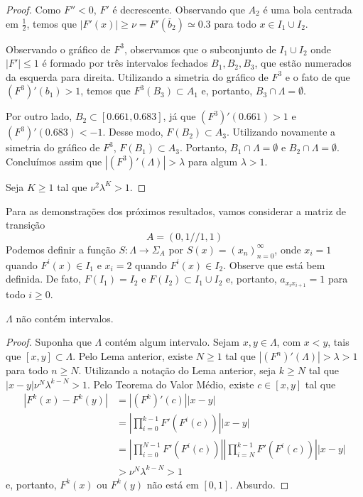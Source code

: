 \begin{proof}
Como $F'' < 0$, $F'$ é decrescente. Observando que $A_2$ é uma bola centrada em $\frac{1}{2}$, temos que $|F'(x)| \geq \nu = F'(\bar{b}_2) \simeq 0.3$ para todo $x \in I_1 \cup I_2$.

Observando o gráfico de $F^3$, observamos que o subconjunto de $I_1 \cup I_2$ onde $|F'| \leq 1$ é formado por três intervalos fechados $B_1, B_2, B_3$, que estão numerados da esquerda para direita. Utilizando a simetria do gráfico de $F^3$ e o fato de que $(F^3)'(b_1) > 1$, temos que $F^3(B_3) \subset A_1$ e, portanto, $B_3 \cap \Lambda = \emptyset$.

Por outro lado, $B_2 \subset [0.661, 0.683]$, já que $(F^3)'(0.661) > 1$ e $(F^3)'(0.683) < -1$. Desse modo, $F(B_2) \subset A_3$. Utilizando novamente a simetria do gráfico de $F^3$, $F(B_1) \subset A_3$. Portanto, $B_1 \cap \Lambda = \emptyset$ e $B_2 \cap \Lambda = \emptyset$. Concluímos assim que $|(F^3)'(\Lambda)| > \lambda$ para algum $\lambda > 1$.

Seja $K \geq 1$ tal que $\nu^2 \lambda^K > 1$. 


\end{proof}


Para as demonstrações dos próximos resultados, vamos considerar a matriz de transição
$$A = (0, 1 // 1, 1)$$
Podemos definir a função $S: \Lambda \to \Sigma_A$ por $S(x) = (x_n)_{n=0}^\infty$, onde $x_i = 1$ quando $F^i(x) \in I_1$ e $x_i = 2$ quando $F^i(x) \in I_2$. Observe que está bem definida. De fato, $F(I_1) = I_2$ e $F(I_2) \subset I_1 \cup I_2$ e, portanto, $a_{x_i x_{i+1}} = 1$ para todo $i \geq 0$. 

\begin{lemma}
$\Lambda$ não contém intervalos.
\end{lemma}

\begin{proof}
Suponha que $\Lambda$ contém algum intervalo. Sejam $x, y \in \Lambda$, com $x < y$, tais que $[x, y] \subset \Lambda$. Pelo Lema anterior, existe $N \geq 1$ tal que $|(F^n)'(\Lambda)| > \lambda > 1$ para todo $n \geq N$. Utilizando a notação do Lema anterior, seja $k \geq N$ tal que $|x - y| \nu^N \lambda^{k - N} > 1$. Pelo Teorema do Valor Médio, existe $c \in [x, y]$ tal que
\begin{align*}
|F^k(x) - F^k(y)| & = |(F^k)'(c)||x-y| \\
& = \left| \prod_{i=0}^{k-1} F'(F^i(c)) \right| |x-y| \\ 
& = \left| \prod_{i=0}^{N-1} F'(F^i(c)) \right| \left| \prod_{i=N}^{k-1} F'(F^i(c)) \right| |x-y| \\
& > \nu^N \lambda^{k-N} > 1
\end{align*}
e, portanto, $F^k(x)$ ou $F^k(y)$ não está em $[0,1]$. Absurdo.
\end{proof}

